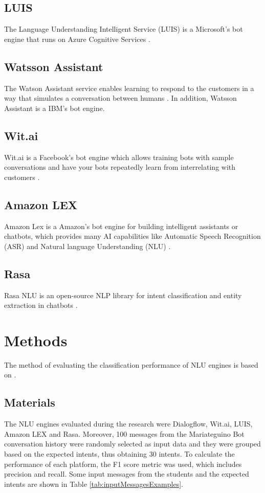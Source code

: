 \documentclass[conference, letterpaper]{IEEEtran}
\begin{document}
\subsection{LUIS}
The Language Understanding Intelligent Service (LUIS) is a Microsoft's bot engine that runs on Azure Cognitive Services \cite{pathak2018iot}.
\subsection{Watsson Assistant}
The Watson Assistant service enables learning to respond to the customers in a way that simulates a conversation between humans \cite{vetter2018enhancing}. In addition, Watsson Assistant is a IBM's bot engine.
\subsection{Wit.ai}
Wit.ai is a Facebook's bot engine which allows training bots with sample conversations and have your bots repeatedly learn from interrelating with customers \cite{seligman2018artificial}.
\subsection{Amazon LEX}
Amazon Lex is a Amazon's bot engine for building intelligent assistants or chatbots, which provides many AI capabilities like Automatic Speech Recognition (ASR) and Natural language Understanding (NLU) \cite{tripuraneni2019hands}.
\subsection{Rasa}
Rasa NLU is an open-source NLP library for intent classification and entity extraction in chatbots \cite{raj2018building}.

\section{Methods}
The method of evaluating the classification performance of NLU engines is based on \cite{Braun2017}.
\subsection{Materials}
The NLU engines evaluated during the research were Dialogflow, Wit.ai, LUIS, Amazon LEX and Rasa. Moreover, 100 messages from the Mariateguino Bot conversation history were randomly selected as input data and they were grouped based on the expected intents, thus obtaining 30 intents. To calculate the performance of each platform, the F1 score metric was used, which includes precision and recall. Some input messages from the students and the expected intents are shown in Table \ref{tab:inputMessagesExamples}.
\end{document}

